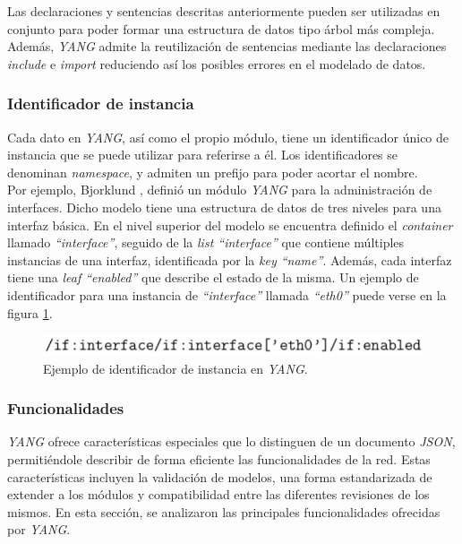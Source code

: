 Las declaraciones y sentencias descritas anteriormente pueden ser utilizadas en conjunto para poder formar una estructura de datos tipo árbol más compleja.
Además, \textit{YANG} admite la reutilización de sentencias mediante las declaraciones \textit{include} e \textit{import} reduciendo así los posibles errores en el modelado de datos.

\subsubsection{Identificador de instancia }
Cada dato en \textit{YANG}, así como el propio módulo, tiene un identificador único de instancia que se puede utilizar para referirse a él. Los identificadores se denominan \textit{namespace}, y admiten un prefijo para poder acortar el nombre. 
\\

Por ejemplo, Bjorklund \parencite{yangsystem}, definió un módulo \textit{YANG} para la administración de interfaces. Dicho modelo tiene una estructura de datos de tres niveles para una interfaz básica. En el nivel superior del modelo se encuentra definido el \textit{container} llamado \textit{“interface”}, seguido de la \textit{list “interface”} que contiene múltiples instancias de una interfaz, identificada por la \textit{key “name”}. Además, cada interfaz tiene una \textit{leaf “enabled”} que describe el estado de la misma. Un ejemplo de identificador para una instancia de \textit{“interface”} llamada \textit{“eth0”} puede verse en la figura \ref{fig:interfaceyang}.

\begin{figure}[htbp]
	\centering
	\includegraphics[scale=0.9]{Figures/interface-yang.pdf}
	\caption{Ejemplo de identificador de instancia en \textit{YANG}.}
	\label{fig:interfaceyang}
  \end{figure}

  \subsubsection{Funcionalidades}
  \textit{YANG} ofrece características especiales que lo distinguen de un documento \textit{JSON}, permitiéndole describir de forma eficiente las funcionalidades de la red. Estas características incluyen la validación de modelos, una forma estandarizada de extender a los módulos y compatibilidad entre las diferentes revisiones de los mismos. En esta sección, se analizaron las principales funcionalidades ofrecidas por \textit{YANG}.

